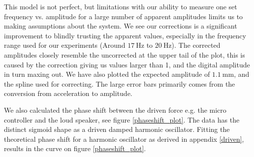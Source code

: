 \documentclass[12pt,oneside,a4paper]{article}
\numberwithin{equation}{section}
\begin{document}
{{{{\begin{figure}[h]
\begin{subfigure}[t]{0.49\textwidth}
	\end{subfigure}
\end{figure}
This model is not perfect, but limitations with our ability to measure one set frequency vs. amplitude for a large number of apparent amplitudes limits us to making assumptions about the system. We see our corrections is a significant improvement to blindly trusting the apparent values, especially in the frequency range used for our experiments (Around $\SI{17}{\hertz}$ to $\SI{20}{\hertz}$). The corrected amplitudes closely resemble the uncorrected at the upper tail of the plot, this is caused by the correction giving us values larger than 1, and the digital amplitude in turn maxing out. We have also plotted the expected amplitude of $\SI{1.1}{\mm}$, and the spline used for correcting. The large error bars primarily comes from the conversion from acceleration to amplitude.

We also calculated the phase shift between the driven force e.g. the micro controller and the loud speaker, see figure \ref{phaseshift_plot}. The data has the distinct sigmoid shape as a driven damped harmonic oscillator. Fitting the theoretical phase shift for a harmonic oscillator as derived in appendix \ref{driven}, results in the curve on figure \ref{phaseshift_plot}.
 
\begin{figure}[h]
	\centering
	\begin{subfigure}[t]{0.49\textwidth}
		

\end{subfigure}
\end{figure}}}}}
\end{document}
